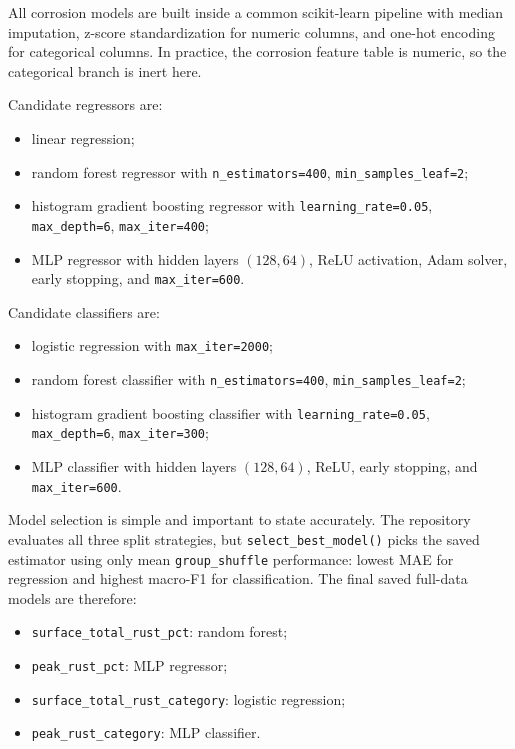 \documentclass[11pt,a4paper]{article}
\begin{document}
All corrosion models are built inside a common scikit-learn pipeline with median imputation, z-score standardization for numeric columns, and one-hot encoding for categorical columns. In practice, the corrosion feature table is numeric, so the categorical branch is inert here.

Candidate regressors are:
\begin{itemize}
  \item linear regression;
  \item random forest regressor with \texttt{n\_estimators=400}, \texttt{min\_samples\_leaf=2};
  \item histogram gradient boosting regressor with \texttt{learning\_rate=0.05}, \texttt{max\_depth=6}, \texttt{max\_iter=400};
  \item MLP regressor with hidden layers \((128,64)\), ReLU activation, Adam solver, early stopping, and \texttt{max\_iter=600}.
\end{itemize}

Candidate classifiers are:
\begin{itemize}
  \item logistic regression with \texttt{max\_iter=2000};
  \item random forest classifier with \texttt{n\_estimators=400}, \texttt{min\_samples\_leaf=2};
  \item histogram gradient boosting classifier with \texttt{learning\_rate=0.05}, \texttt{max\_depth=6}, \texttt{max\_iter=300};
  \item MLP classifier with hidden layers \((128,64)\), ReLU, early stopping, and \texttt{max\_iter=600}.
\end{itemize}

Model selection is simple and important to state accurately. The repository evaluates all three split strategies, but \texttt{select\_best\_model()} picks the saved estimator using only mean \texttt{group\_shuffle} performance: lowest MAE for regression and highest macro-F1 for classification. The final saved full-data models are therefore:
\begin{itemize}
  \item \texttt{surface\_total\_rust\_pct}: random forest;
  \item \texttt{peak\_rust\_pct}: MLP regressor;
  \item \texttt{surface\_total\_rust\_category}: logistic regression;
  \item \texttt{peak\_rust\_category}: MLP classifier.
\end{itemize}
\end{document}
